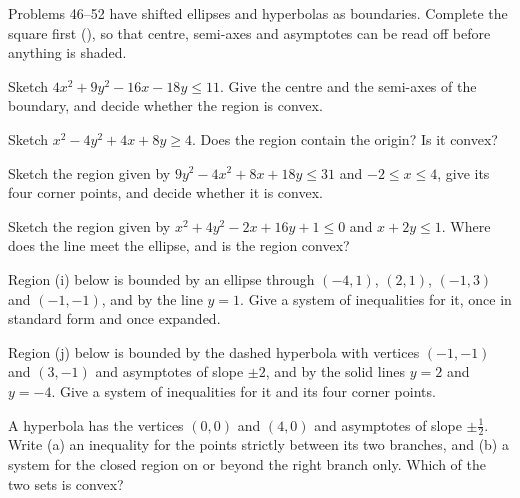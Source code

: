 Problems 46--52 have shifted ellipses and hyperbolas as boundaries.
Complete the square first (), so that centre, semi-axes and
asymptotes can be read off before anything is shaded.

\begin{problems}[resume]
  \item Sketch $4x^{2}+9y^{2}-16x-18y\le11$. Give the centre and the
        semi-axes of the boundary, and decide whether the region is convex.
  \item Sketch $x^{2}-4y^{2}+4x+8y\ge4$. Does the region contain the
        origin? Is it convex?
  \item Sketch the region given by $9y^{2}-4x^{2}+8x+18y\le31$ and
        $-2\le x\le4$, give its four corner points, and decide whether it is
        convex.
  \item Sketch the region given by $x^{2}+4y^{2}-2x+16y+1\le0$ and
        $x+2y\le1$. Where does the line meet the ellipse, and is the region
        convex?
  \item Region (i) below is bounded by an ellipse through $(-4,1)$,
        $(2,1)$, $(-1,3)$ and $(-1,-1)$, and by the line $y=1$. Give a
        system of inequalities for it, once in standard form and once
        expanded.
  \item Region (j) below is bounded by the dashed hyperbola with vertices
        $(-1,-1)$ and $(3,-1)$ and asymptotes of slope $\pm2$, and by the
        solid lines $y=2$ and $y=-4$. Give a system of inequalities for it
        and its four corner points.
  \item A hyperbola has the vertices $(0,0)$ and $(4,0)$ and asymptotes of
        slope $\pm\tfrac12$. Write (a) an inequality for the points
        strictly between its two branches, and (b) a system for the closed
        region on or beyond the right branch only. Which of the two sets is
        convex?
\end{problems}

